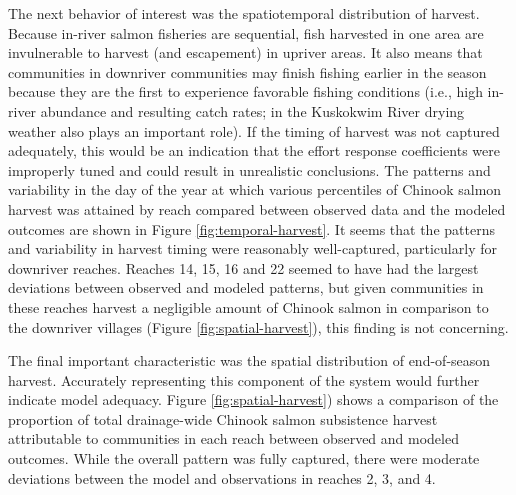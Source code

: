 \documentclass[12pt,]{book}
\theoremstyle{definition}
\theoremstyle{definition}
\theoremstyle{definition}
\theoremstyle{remark}
\begin{document}
The next behavior of interest was the spatiotemporal distribution of
harvest. Because in-river salmon fisheries are sequential, fish
harvested in one area are invulnerable to harvest (and escapement) in
upriver areas. It also means that communities in downriver communities
may finish fishing earlier in the season because they are the first to
experience favorable fishing conditions (i.e., high in-river abundance
and resulting catch rates; in the Kuskokwim River drying weather also
plays an important role). If the timing of harvest was not captured
adequately, this would be an indication that the effort response
coefficients were improperly tuned and could result in unrealistic
conclusions. The patterns and variability in the day of the year at
which various percentiles of Chinook salmon harvest was attained by
reach compared between observed data and the modeled outcomes are shown
in Figure \ref{fig:temporal-harvest}. It seems that the patterns and
variability in harvest timing were reasonably well-captured,
particularly for downriver reaches. Reaches 14, 15, 16 and 22 seemed to
have had the largest deviations between observed and modeled patterns,
but given communities in these reaches harvest a negligible amount of
Chinook salmon in comparison to the downriver villages (Figure
\ref{fig:spatial-harvest}), this finding is not concerning.

The final important characteristic was the spatial distribution of
end-of-season harvest. Accurately representing this component of the
system would further indicate model adequacy. Figure
\ref{fig:spatial-harvest}) shows a comparison of the proportion of total
drainage-wide Chinook salmon subsistence harvest attributable to
communities in each reach between observed and modeled outcomes. While
the overall pattern was fully captured, there were moderate deviations
between the model and observations in reaches 2, 3, and 4.

\clearpage
\end{document}
